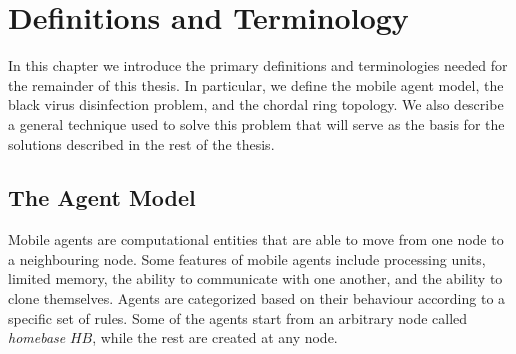 \chapter {Definitions and Terminology}
\label{PM}

In this chapter we  introduce the primary definitions and terminologies needed for the remainder of this thesis.
In particular, we define the mobile agent model, the black virus  disinfection problem,  and the chordal ring topology. We also describe a general technique used to solve this problem that will serve as the basis for the solutions described in the rest of the thesis.
%
%



\section{The Agent Model} 


Mobile agents are computational entities that are able to move from one node to a neighbouring node. Some features of mobile agents include processing units, limited memory, the ability to communicate with one another, and the ability to clone themselves. Agents are categorized based on their behaviour according to a specific set of rules. Some of the agents start from an arbitrary node called  {\em homebase} $HB$,  while the rest  are created  at any node. 
  
